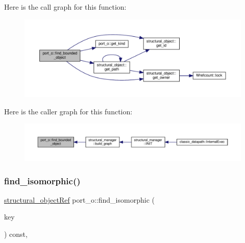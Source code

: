 Here is the call graph for this function\+:
\nopagebreak
\begin{figure}[H]
\begin{center}
\leavevmode
\includegraphics[width=350pt]{df/d75/structport__o_afdb4346833a3eac62db21966c7fc65c5_cgraph}
\end{center}
\end{figure}
Here is the caller graph for this function\+:
\nopagebreak
\begin{figure}[H]
\begin{center}
\leavevmode
\includegraphics[width=350pt]{df/d75/structport__o_afdb4346833a3eac62db21966c7fc65c5_icgraph}
\end{center}
\end{figure}
\mbox{\label{structport__o_a2ece93b5f3aaa09fdadbb373f3f9d31a}} 
\subsubsection{\texorpdfstring{find\+\_\+isomorphic()}{find\_isomorphic()}}
{\footnotesize\ttfamily \hyperlink{structural__objects_8hpp_a8ea5f8cc50ab8f4c31e2751074ff60b2}{structural\+\_\+object\+Ref} port\+\_\+o\+::find\+\_\+isomorphic (\begin{DoxyParamCaption}\item[{const \hyperlink{structural__objects_8hpp_a8ea5f8cc50ab8f4c31e2751074ff60b2}{structural\+\_\+object\+Ref}}]{key }\end{DoxyParamCaption}) const\hspace{0.3cm}{\ttfamily [override]}, {\ttfamily [virtual]}}



